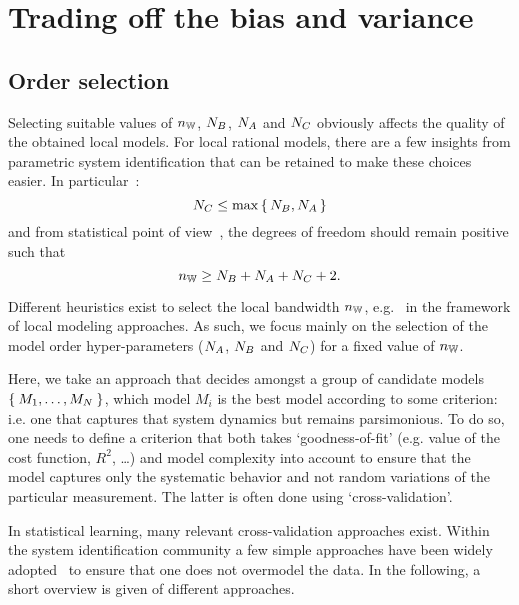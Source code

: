 \section{Trading off the bias and variance}

\subsection{Order selection}
\label{sec:nparam:orderSelection}
Selecting suitable values of $n_{\mathbb{W}}$, $N_{B}$, $N_{A}$ and $N_{C}$ obviously affects the quality of the obtained local models.
For local rational models, there are a few insights from parametric system identification that can be retained to make these choices easier.
In particular~\citep{Pintelon2010LPM1}:
\begin{equation}
N_{C} \leq \max\set{\ensuremath{N_{B}},\ensuremath{N_{A}}}
\end{equation}
 and from statistical point of view~\citep{Mahata2006}, the degrees of freedom should remain positive such that 
 \begin{equation}
 n_{\mathbb{W}} \geq N_{B} + N_{A} + N_{C} + 2
 \text{.}
 \end{equation}
 
Different heuristics exist to select the local bandwidth $n_{\mathbb{W}}$, e.g.~\citet{Fan1995,Thummala2012LPMBW,Stenman2000ASETFE} in the framework of local modeling approaches.
As such, we focus mainly on the selection of the model order hyper-parameters ($N_{A}$, $N_{B}$ and $N_{C}$) for a fixed value of $n_{\mathbb{W}}$.

Here, we take an approach that decides amongst a group of candidate models $\Set{M_1, \ldots, M_N}$, which model $M_i$ is the best model according to some criterion: i.e. one that captures that system dynamics but remains parsimonious.
To do so, one needs to define a criterion that both takes `goodness-of-fit' (e.g. value of the cost function, $R^2$, \ldots) and model complexity into account to ensure that the model captures only the systematic behavior and not random variations of the particular measurement.
The latter is often done using `cross-validation'.

In statistical learning, many relevant cross-validation approaches exist.
Within the system identification community a few simple approaches have been widely adopted~\citep[Chapter 11]{Pintelon2012} to ensure that one does not overmodel the data.
In the following, a short overview is given of different approaches.

